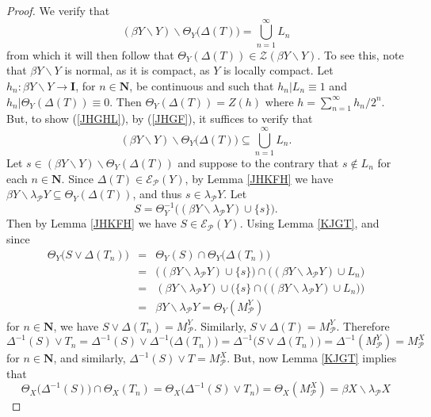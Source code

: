\documentclass{amsart}
\theoremstyle{definition}
\theoremstyle{remark}
\theoremstyle{notation}
\numberwithin{equation}{section}
\begin{document}
\begin{proof}
We verify that
\begin{equation}\label{JHGHL}
(\beta Y\backslash Y)\backslash\Theta_Y\big(\Delta(T)\big)=\bigcup_{n=1}^\infty L_n
\end{equation}
from which it will then follow that $\Theta_Y(\Delta(T))\in {\mathscr Z}(\beta Y\backslash Y)$. To see this, note that $\beta Y\backslash Y$ is normal, as it is compact,  as $Y$ is locally compact. Let
$h_n:\beta Y\backslash Y\rightarrow\mathbf{I}$, for $n\in \mathbf{N}$, be continuous and such that $h_n|L_n\equiv 1$ and
$h_n|\Theta_Y(\Delta(T))\equiv 0$. Then $\Theta_Y(\Delta(T))=Z(h)$ where $h=\sum_{n=1}^\infty h_n/2^n$. But, to show (\ref{JHGHL}), by (\ref{JHGF}),
it suffices to verify that
\[(\beta Y\backslash Y)\backslash\Theta_Y\big(\Delta(T)\big)\subseteq\bigcup_{n=1}^\infty L_n.\]
Let $s\in (\beta Y\backslash Y)\backslash\Theta_Y(\Delta(T))$ and suppose to the contrary that $s\notin L_n$ for each $n\in \mathbf{N}$. Since $\Delta(T)\in{\mathscr E}_{{\mathcal P}}(Y)$, by  Lemma \ref{JHKFH} we have
$\beta Y\backslash\lambda_{{\mathcal P}} Y\subseteq \Theta_Y(\Delta(T))$, and thus $s\in \lambda_{{\mathcal P}} Y$. Let
\[S=\Theta_Y^{-1}\big((\beta Y\backslash\lambda_{{\mathcal P}} Y)\cup\{s\}\big).\]
Then by Lemma \ref{JHKFH} we have $S\in{\mathscr E}_{{\mathcal P}}(Y)$. Using Lemma \ref{KJGT}, and since
\begin{eqnarray*}
\Theta_Y\big(S\vee\Delta(T_n)\big)&=&\Theta_Y(S)\cap\Theta_Y\big(\Delta(T_n)\big)\\&=&\big((\beta Y\backslash\lambda_{{\mathcal P}} Y)\cup\{s\}\big)\cap\big((\beta Y\backslash\lambda_{{\mathcal P}} Y)\cup L_n\big)\\&=&(\beta Y\backslash\lambda_{{\mathcal P}} Y)\cup\big(\{s\}\cap\big((\beta Y\backslash\lambda_{{\mathcal P}} Y)\cup L_n\big)\big)\\&=&\beta Y\backslash\lambda_{{\mathcal P}} Y=\Theta_Y(M^Y_{{\mathcal P}})
\end{eqnarray*}
for $n\in \mathbf{N}$, we have $S\vee\Delta(T_n)=M^Y_{{\mathcal P}}$. Similarly, $S\vee\Delta(T)=M^Y_{{\mathcal P}}$. Therefore
\[\Delta^{-1}(S)\vee T_n=\Delta^{-1}(S)\vee\Delta^{-1}\big(\Delta(T_n)\big)=\Delta^{-1}\big(S\vee\Delta(T_n)\big)=\Delta^{-1}(M^Y_{{\mathcal P}})=M^X_{{\mathcal P}}\]
for $n\in \mathbf{N}$, and similarly,
$\Delta^{-1}(S)\vee T=M^X_{{\mathcal P}}$. But, now Lemma \ref{KJGT} implies that
\begin{equation}\label{KHF}
\Theta_X\big(\Delta^{-1}(S)\big)\cap\Theta_X(T_n)=\Theta_X\big(\Delta^{-1}(S)\vee T_n\big)=\Theta_X(M^X_{{\mathcal P}})=\beta X\backslash\lambda_{{\mathcal P}} X

\end{equation}
\end{proof}
\end{document}
